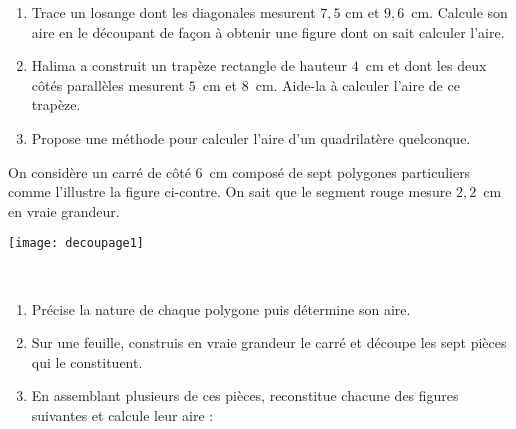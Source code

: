 \begin{activite}
\end{activite}


\newpage

\begin{activite}

\begin{enumerate}
\item Trace un losange dont les diagonales mesurent $7,5$ cm et $9,6$ cm. Calcule son aire en le découpant de façon à obtenir une figure dont on sait calculer l'aire.

\item Halima a construit un trapèze rectangle de hauteur $4$ cm et dont les deux côtés parallèles mesurent $5$ cm et $8$ cm. Aide-la à calculer l’aire de ce trapèze.

\item Propose une méthode pour calculer l'aire d'un quadrilatère quelconque.
\end{enumerate}

\end{activite}


\begin{activite}[Découpages]

\begin{minipage}[c]{0.76\linewidth}
On considère un carré de côté 6 cm composé de sept polygones particuliers comme l'illustre la figure ci-contre. On sait que le segment rouge mesure $2,2$ cm en vraie grandeur.
 \end{minipage} \hfill%
 \begin{minipage}[c]{0.2\linewidth}
  \texttt{[image: decoupage1]}
  \end{minipage} \\

\begin{enumerate}
\item Précise la nature de chaque polygone puis détermine son aire.

\item Sur une feuille, construis en vraie grandeur le carré et découpe les sept pièces qui le constituent.

\item En assemblant plusieurs de ces pièces, reconstitue chacune des figures suivantes et calcule leur aire :

\end{enumerate}
\end{activite}




